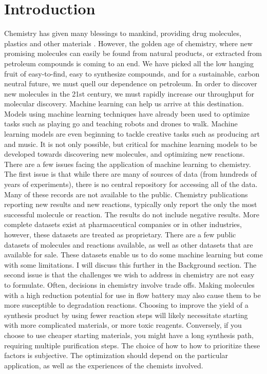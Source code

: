\chapter{Introduction}
\thispagestyle{plain}

Chemistry has given many blessings to mankind, providing drug molecules, plastics and other materials \cite{napoleons_buttons}. However, the golden age of chemistry, where new promising molecules can easily be found from natural products, or extracted from petroleum compounds is coming to an end. We have picked all the low hanging fruit of easy-to-find, easy to synthesize compounds, and for a sustainable, carbon neutral future, we must quell our dependence on petroleum.
In order to discover new molecules in the 21st century, we must rapidly increase our throughput for molecular discovery. Machine learning can help us arrive at this destination. Models using machine learning techniques have already been used to optimize tasks such as playing go and teaching robots and drones to walk. Machine learning models are even beginning to tackle creative tasks such as producing art and music. 
It is not only possible, but critical for machine learning models to be developed towards discovering new molecules, and optimizing new reactions.
There are a few issues facing the application of machine learning to chemistry. The first issue is that while there are many of sources of data (from hundreds of years of experiments), there is no central repository for accessing all of the data. Many of these records are not available to the public. Chemistry publications reporting new results and new reactions, typically only report the only the most successful molecule or reaction. The results do not include negative results. More complete datasets exist at pharmaceutical companies or in other industries, however, these datasets are treated as  proprietary. There are a few public datasets of molecules and reactions available, as well as other datasets that are available for sale. These datasets enable us to do some machine learning but come with some limitations. I will discuss this further in the Background section.
The second issue is that the challenges we wish to address in chemistry are not easy to formulate. Often, decisions in chemistry involve trade offs. Making molecules with a high reduction potential for use in flow battery may also cause them to be more susceptible to degradation reactions.\cite{tabor_2018} Choosing to improve the yield of a synthesis product by using fewer reaction steps will likely necessitate starting with more complicated materials, or more toxic reagents. Conversely, if you choose to use cheaper starting materials, you might have a long synthesis path, requiring multiple purification steps. The choice of how to how to prioritize these factors is subjective. The optimization should depend on the particular application, as well as the experiences of the chemists involved.
